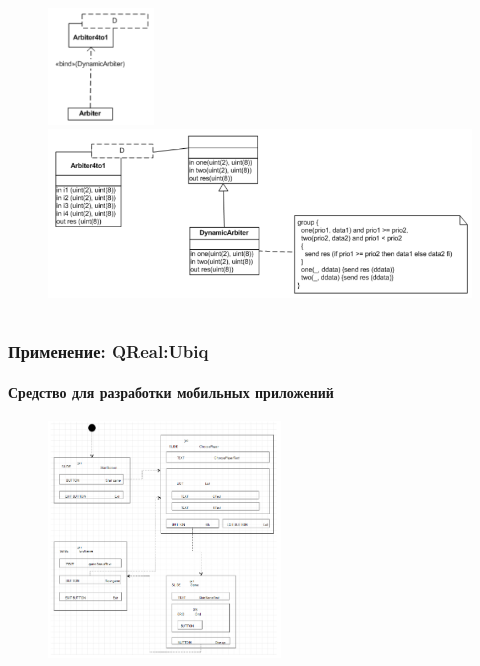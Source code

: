 \documentclass[14pt]{beamer}
\begin{document}
\begin{frame}
\begin{columns}[onlytextwidth]
\begin{column}{0.65\textwidth}
\begin{figure}
            	\begin{center}
             		\includegraphics[width=0.25\textwidth]{images/presentation/hascol3.png}\\
             		\vspace{0.5cm}\includegraphics[width=\textwidth]{images/presentation/hascol2.png}
            	\end{center}
            \end{figure}
        \end{column}
    \end{columns}
\end{frame}

\begin{frame}
    \frametitle{Применение: QReal:Ubiq}
    \framesubtitle{Средство для разработки мобильных приложений}
    \begin{figure}
       	\begin{center}
        	\includegraphics[width=0.55\textwidth]{images/presentation/ubiq.png}
       	\end{center}
    \end{figure}
\end{frame}
\end{document}

